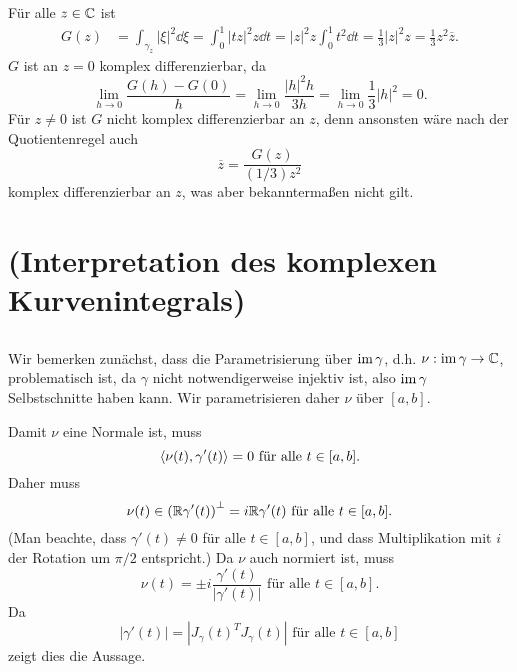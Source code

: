 \documentclass[a4paper,10pt]{article}
\begin{document}
Für alle $z \in \mathbb{C}$ ist
\begin{align*}
 G(z)
 &= \int_{\gamma_z} |\xi|^2 \dd{\xi}
 = \int_0^1 |tz|^2 z \dd{t}
 = |z|^2 z \int_0^1 t^2 \dd{t}
 = \frac{1}{3} |z|^2 z
 = \frac{1}{3} z^2 \overline{z}.
\end{align*}
$G$ ist an $z = 0$ komplex differenzierbar, da
\[
 \lim_{h \to 0} \frac{G(h)-G(0)}{h}
 = \lim_{h \to 0} \frac{|h|^2 h}{3h}
 = \lim_{h \to 0} \frac{1}{3} |h|^2
 = 0.
\]
Für $z \neq 0$ ist $G$ nicht komplex differenzierbar an $z$, denn ansonsten wäre nach der Quotientenregel auch
\[
 \overline{z} = \frac{G(z)}{(1/3)z^2}
\]
komplex differenzierbar an $z$, was aber bekanntermaßen nicht gilt.





\section{(Interpretation des komplexen Kurvenintegrals)}


\subsection{}
Wir bemerken zunächst, dass die Parametrisierung über $\operatorname{im} \gamma$, d.h. $\nu : \operatorname{im} \gamma \to \mathbb{C}$, problematisch ist, da $\gamma$ nicht notwendigerweise injektiv ist, also $\operatorname{im} \gamma$ Selbstschnitte haben kann. Wir parametrisieren daher $\nu$ über $[a,b]$.

Damit $\nu$ eine Normale ist, muss
\[
 \left\langle \nu(t), \gamma'(t) \right\rangle = 0 \text{ für alle } t \in [a,b].
\]
Daher muss
\[
 \nu(t) \in \left( \mathbb{R} \gamma'(t) \right)^{\bot} = i \mathbb{R} \gamma'(t) \text{ für alle } t \in [a,b].
\]
(Man beachte, dass $\gamma'(t) \neq 0$ für alle $t \in [a,b]$, und dass Multiplikation mit $i$ der Rotation um $\pi/2$ entspricht.) Da $\nu$ auch normiert ist, muss
\[
 \nu(t) = \pm i \frac{\gamma'(t)}{|\gamma'(t)|} \text{ für alle } t \in [a,b].
\]
Da
\[
 |\gamma'(t)| = \left|J_\gamma(t)^T J_\gamma(t)\right| \text{ für alle } t \in [a,b]
\]
zeigt dies die Aussage.
\end{document}
